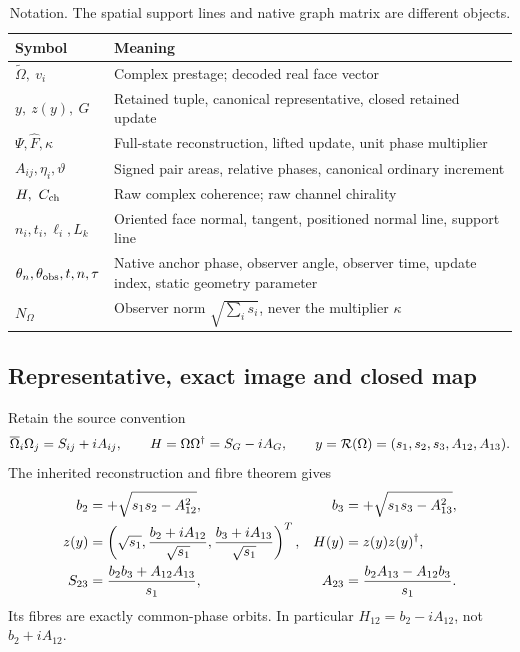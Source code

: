 \begin{table}[htbp]\centering\small
\caption{Notation. The spatial support lines and native graph matrix are different objects.}\label{tab:notation}
\begin{tabularx}{\textwidth}{@{}lY@{}}\toprule
Symbol & Meaning\\\midrule
\(\widetilde\Omega,\ v_i\) & Complex prestage; decoded real face vector\\
\(y,\ z(y),\ G\) & Retained tuple, canonical representative, closed retained update\\
\(\Psi,\widehat F,\kappa\) & Full-state reconstruction, lifted update, unit phase multiplier\\
\(A_{ij},\eta_i,\vartheta\) & Signed pair areas, relative phases, canonical ordinary increment\\
\(H,\ C_{\rm ch}\) & Raw complex coherence; raw channel chirality\\
\(n_i,t_i,\ell_i,L_k\) & Oriented face normal, tangent, positioned normal line, support line\\
\(\theta_n,\theta_{\rm obs},t,n,\tau\) & Native anchor phase, observer angle, observer time, update index, static geometry parameter\\
\(N_\Omega\) & Observer norm \(\sqrt{\sum_i s_i}\), never the multiplier \(\kappa\)\\\bottomrule
\end{tabularx}
\end{table}

\subsection{Representative, exact image and closed map}
Retain the source convention
\begin{equation}
\overline\Omega_i\Omega_j=S_{ij}+iA_{ij},\qquad
H=\Omega\Omega^\dagger=S_G-iA_G,
\qquad y=\mathcal R(\Omega)=(s_1,s_2,s_3,A_{12},A_{13}).
\label{eq:coordinates}
\end{equation}
The inherited reconstruction and fibre theorem \cite[Section 5]{potential} gives
\begin{align}
b_2&=+\sqrt{s_1s_2-A_{12}^2},&b_3&=+\sqrt{s_1s_3-A_{13}^2},\notag\\
z(y)&=\left(\sqrt{s_1},\frac{b_2+iA_{12}}{\sqrt{s_1}},
\frac{b_3+iA_{13}}{\sqrt{s_1}}\right)^T,&H(y)&=z(y)z(y)^\dagger,\label{eq:representative}\\
S_{23}&=\frac{b_2b_3+A_{12}A_{13}}{s_1},&
A_{23}&=\frac{b_2A_{13}-A_{12}b_3}{s_1}.
\label{eq:thirdpair}
\end{align}
Its fibres are exactly common-phase orbits. In particular \(H_{12}=b_2-iA_{12}\), not \(b_2+iA_{12}\).

